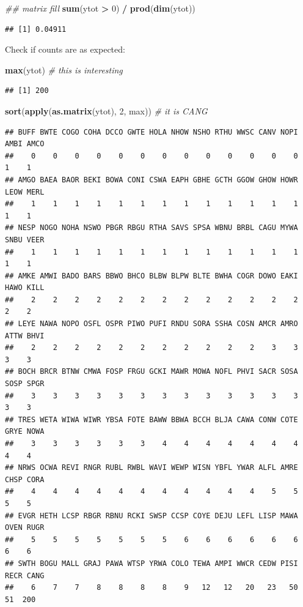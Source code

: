 \documentclass[12pt,]{book}
\newenvironment{Shaded}{\begin{snugshade}}{\end{snugshade}}
\newcommand{\CommentTok}[1]{\textcolor[rgb]{0.56,0.35,0.01}{\textit{#1}}}
\newcommand{\DecValTok}[1]{\textcolor[rgb]{0.00,0.00,0.81}{#1}}
\newcommand{\KeywordTok}[1]{\textcolor[rgb]{0.13,0.29,0.53}{\textbf{#1}}}
\newcommand{\NormalTok}[1]{#1}
\newcommand{\OperatorTok}[1]{\textcolor[rgb]{0.81,0.36,0.00}{\textbf{#1}}}
\newcommand{\StringTok}[1]{\textcolor[rgb]{0.31,0.60,0.02}{#1}}
\begin{document}
\begin{Shaded}
\begin{Highlighting}[]
\CommentTok{## matrix fill}
\KeywordTok{sum}\NormalTok{(ytot }\OperatorTok{>}\StringTok{ }\DecValTok{0}\NormalTok{) }\OperatorTok{/}\StringTok{ }\KeywordTok{prod}\NormalTok{(}\KeywordTok{dim}\NormalTok{(ytot))}
\end{Highlighting}
\end{Shaded}

\begin{verbatim}
## [1] 0.04911
\end{verbatim}

Check if counts are as expected:

\begin{Shaded}
\begin{Highlighting}[]
\KeywordTok{max}\NormalTok{(ytot) }\CommentTok{# this is interesting}
\end{Highlighting}
\end{Shaded}

\begin{verbatim}
## [1] 200
\end{verbatim}

\begin{Shaded}
\begin{Highlighting}[]
\KeywordTok{sort}\NormalTok{(}\KeywordTok{apply}\NormalTok{(}\KeywordTok{as.matrix}\NormalTok{(ytot), }\DecValTok{2}\NormalTok{, max)) }\CommentTok{# it is CANG}
\end{Highlighting}
\end{Shaded}

\begin{verbatim}
## BUFF BWTE COGO COHA DCCO GWTE HOLA NHOW NSHO RTHU WWSC CANV NOPI AMBI AMCO 
##    0    0    0    0    0    0    0    0    0    0    0    0    0    1    1 
## AMGO BAEA BAOR BEKI BOWA CONI CSWA EAPH GBHE GCTH GGOW GHOW HOWR LEOW MERL 
##    1    1    1    1    1    1    1    1    1    1    1    1    1    1    1 
## NESP NOGO NOHA NSWO PBGR RBGU RTHA SAVS SPSA WBNU BRBL CAGU MYWA SNBU VEER 
##    1    1    1    1    1    1    1    1    1    1    1    1    1    1    1 
## AMKE AMWI BADO BARS BBWO BHCO BLBW BLPW BLTE BWHA COGR DOWO EAKI HAWO KILL 
##    2    2    2    2    2    2    2    2    2    2    2    2    2    2    2 
## LEYE NAWA NOPO OSFL OSPR PIWO PUFI RNDU SORA SSHA COSN AMCR AMRO ATTW BHVI 
##    2    2    2    2    2    2    2    2    2    2    2    3    3    3    3 
## BOCH BRCR BTNW CMWA FOSP FRGU GCKI MAWR MOWA NOFL PHVI SACR SOSA SOSP SPGR 
##    3    3    3    3    3    3    3    3    3    3    3    3    3    3    3 
## TRES WETA WIWA WIWR YBSA FOTE BAWW BBWA BCCH BLJA CAWA CONW COTE GRYE NOWA 
##    3    3    3    3    3    3    4    4    4    4    4    4    4    4    4 
## NRWS OCWA REVI RNGR RUBL RWBL WAVI WEWP WISN YBFL YWAR ALFL AMRE CHSP CORA 
##    4    4    4    4    4    4    4    4    4    4    4    5    5    5    5 
## EVGR HETH LCSP RBGR RBNU RCKI SWSP CCSP COYE DEJU LEFL LISP MAWA OVEN RUGR 
##    5    5    5    5    5    5    5    6    6    6    6    6    6    6    6 
## SWTH BOGU MALL GRAJ PAWA WTSP YRWA COLO TEWA AMPI WWCR CEDW PISI RECR CANG 
##    6    7    7    8    8    8    8    9   12   12   20   23   50   51  200
\end{verbatim}
\end{document}
